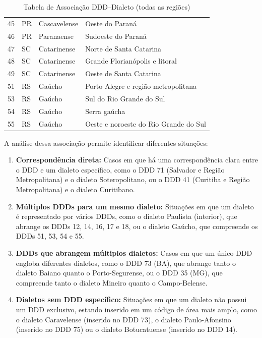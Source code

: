 \begin{table}[ht]
\begin{tabular}{llll}
    45 & PR & Cascavelense      & Oeste do Paraná                     \\
    46 & PR & Paranaense        & Sudoeste do Paraná                  \\
    47 & SC & Catarinense       & Norte de Santa Catarina             \\
    48 & SC & Catarinense       & Grande Florianópolis e litoral      \\
    49 & SC & Catarinense       & Oeste de Santa Catarina             \\
    51 & RS & Gaúcho            & Porto Alegre e região metropolitana \\
    53 & RS & Gaúcho            & Sul do Rio Grande do Sul            \\
    54 & RS & Gaúcho            & Serra gaúcha                        \\
    55 & RS & Gaúcho            & Oeste e noroeste do Rio Grande do Sul \\
    \bottomrule
  \end{tabular}
  \caption{Tabela de Associação DDD–Dialeto (todas as regiões)}
  \label{tab:ddd-dialeto-todas}
\end{table}

A análise dessa associação permite identificar diferentes situações:
\begin{enumerate}
    \item \textbf{Correspondência direta:} Casos em que há uma correspondência clara entre o DDD e um dialeto específico, como o DDD 71 (Salvador e Região Metropolitana) e o dialeto Soteropolitano, ou o DDD 41 (Curitiba e Região Metropolitana) e o dialeto Curitibano.
    \item \textbf{Múltiplos DDDs para um mesmo dialeto:} Situações em que um dialeto é representado por vários DDDs, como o dialeto Paulista (interior), que abrange os DDDs 12, 14, 16, 17 e 18, ou o dialeto Gaúcho, que compreende os DDDs 51, 53, 54 e 55.
    \item \textbf{DDDs que abrangem múltiplos dialetos:} Casos em que um único DDD engloba diferentes dialetos, como o DDD 73 (BA), que abrange tanto o dialeto Baiano quanto o Porto-Segurense, ou o DDD 35 (MG), que compreende tanto o dialeto Mineiro quanto o Campo-Belense.
    \item \textbf{Dialetos sem DDD específico:} Situações em que um dialeto não possui um DDD exclusivo, estando inserido em um código de área mais amplo, como o dialeto Caravelense (inserido no DDD 73), o dialeto Paulo-Afonsino (inserido no DDD 75) ou o dialeto Botucatuense (inserido no DDD 14).
\end{enumerate}

